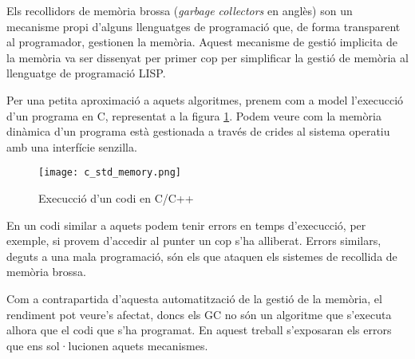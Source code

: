  

Els recollidors de memòria brossa (\textit{garbage collectors} en anglès) son un mecanisme propi d'alguns llenguatges de programació que, 
de forma transparent al programador, gestionen la memòria. Aquest mecanisme de gestió implicita de la memòria va ser dissenyat per primer 
cop per simplificar la gestió de memòria al llenguatge de programació LISP.

\par

Per una petita aproximació a aquets algoritmes, prenem com a model l'execucció d'un programa en C, representat a la figura \ref{fig:codiC}.
Podem veure com la memòria dinàmica d'un programa està gestionada a través de crides al sistema operatiu amb una interfície senzilla. 

\begin{figure}[h]
    \centering
    \texttt{[image: c\_std\_memory.png]}
    \caption{Execucció d'un codi en C/C++}
    \label{fig:codiC}
\end{figure}

En un codi similar a aquets podem tenir errors en temps d'execucció, per exemple, si provem d'accedir al punter un cop s'ha alliberat. 
Errors similars, deguts a una mala programació, són els que ataquen els sistemes de recollida de memòria brossa.

\par
Com a contrapartida d'aquesta automatització de la gestió de la memòria, el rendiment pot veure's afectat, doncs
els GC no són un algoritme que s'executa alhora que el codi que s'ha programat. En aquest treball s'exposaran els errors que ens sol·lucionen aquets mecanismes.

